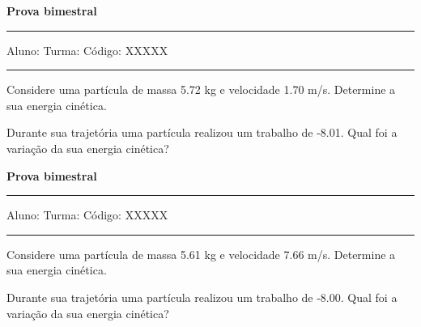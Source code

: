 \documentclass[addpoints]{exam}
\begin{document}
        
\begin{center}
	{\bf \Huge Prova bimestral}
	\vspace{1cm} \hrule \vspace{0.5cm}
	Aluno: \hfill Turma: \hfill Código: XXXXX
	\vspace{0.5cm} \hrule \vspace{0.5cm}
\end{center}
        \begin{questions}
\question[25] Considere uma partícula de massa    5.72 kg e velocidade    1.70 m/s. Determine a sua energia cinética.
\linebreak\linebreak
\begin{oneparchoices}
\end{oneparchoices}
\question[25] Durante sua trajetória uma partícula realizou um trabalho de   -8.01. Qual foi a variação da sua energia cinética?
\linebreak\linebreak
\begin{oneparchoices}
\end{oneparchoices}
\end{questions}
\newpage
\begin{center}
	{\bf \Huge Prova bimestral}
	\vspace{1cm} \hrule \vspace{0.5cm}
	Aluno: \hfill Turma: \hfill Código: XXXXX
	\vspace{0.5cm} \hrule \vspace{0.5cm}
\end{center}
        \begin{questions}
\question[25] Considere uma partícula de massa    5.61 kg e velocidade    7.66 m/s. Determine a sua energia cinética.
\linebreak\linebreak
\begin{oneparchoices}
\end{oneparchoices}
\question[25] Durante sua trajetória uma partícula realizou um trabalho de   -8.00. Qual foi a variação da sua energia cinética?
\linebreak\linebreak
\begin{oneparchoices}
\end{oneparchoices}
\end{questions}
\newpage
\end{document}
